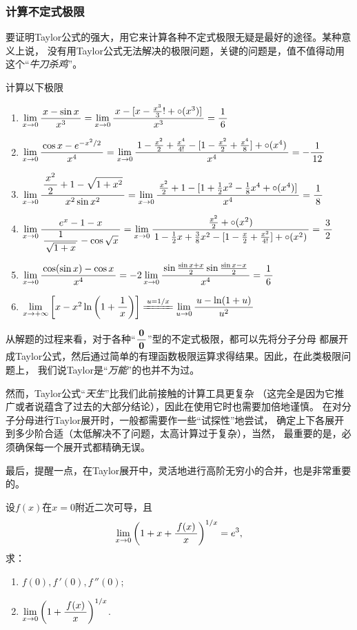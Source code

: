 \subsubsection{计算不定式极限}

要证明Taylor公式的强大，用它来计算各种不定式极限无疑是最好的途径。某种意义上说，
没有用Taylor公式无法解决的极限问题，关键的问题是，值不值得动用这个“{\it 牛刀杀鸡}”。

\egz 计算以下极限
\begin{enumerate}[(1)]
  \setlength{\itemindent}{1cm}
  \item $\lim\limits_{x\to{0}}\displaystyle\frac{\,{x-\sin x}\,}{\,{x^3}\,}
  =\lim\limits_{x\to{0}}\displaystyle\frac{\,{x-[x-\frac{x^3}3!+\circ(x^3)]}\,}{\,{x^3}\,}=\displaystyle\frac{\,{1}\,}{\,{6}\,}$
  \item $\lim\limits_{x\to{0}}\displaystyle\frac{\,{\cos x-e^{-x^2/2}}\,}{\,{x^4}\,}
  =\lim\limits_{x\to{0}}\displaystyle\frac{\,{1-\frac{x^2}2+\frac{x^4}{4!}-[1-\frac{x^2}2+
  \frac{x^4}8]+\circ(x^4)}\,}{\,{x^4}\,}=-\displaystyle\frac{\,{1}\,}{\,{12}\,}$ 
  \item $\lim\limits_{x\to{0}}\displaystyle\frac{\,{\displaystyle\frac{\,{x^2}\,}{\,{2}\,}+1-\sqrt{1+x^2}}\,}{\,{x^2\sin x^2}\,}
  =\lim\limits_{x\to{0}}\displaystyle\frac{\,{\frac{x^2}2+1-[1+\frac12{x^2}-\frac18x^4+\circ(x^4)]}\,}{\,{x^4}\,}
  =\displaystyle\frac{\,{1}\,}{\,{8}\,}$ 
  \item $\lim\limits_{x\to{0}}\displaystyle\frac{\,{e^x-1-x}\,}{\,{\displaystyle\frac{\,{1}\,}{\,{\sqrt{1+x}}\,}-\cos\sqrt x}\,}
  =\lim\limits_{x\to{0}}\displaystyle\frac{\,{\frac{x^2}2+\circ(x^2)}\,}{\,{1-\frac12x+\frac38x^2-[1-\frac{x}2+\frac{x^2}{4!}]+\circ(x^2)}\,}
  =\displaystyle\frac{\,{3}\,}{\,{2}\,}$ 
  \item $\lim\limits_{x\to{0}}\displaystyle\frac{\,{\cos(\sin x)-\cos x}\,}{\,{x^4}\,}
  =-2\lim\limits_{x\to{0}}\displaystyle\frac{\,{\sin\frac{\sin x+x}2\sin\frac{\sin x-x}2}\,}{\,{x^4}\,}=\displaystyle\frac{\,{1}\,}{\,{6}\,}$
  \item $\limx{+\infty}\left[x-x^2\ln\left(1+\df 1x\right)\right]
  \xlongequal{u=1/x}\lim\limits_{u\to0}\df{u-\ln(1+u)}{u^2}$
\end{enumerate}


从解题的过程来看，对于各种“$\displaystyle\frac{\,{\bm0}\,}{\,{\bm0}\,}$”型的不定式极限，都可以先将分子分母
都展开成Taylor公式，然后通过简单的有理函数极限运算求得结果。因此，在此类极限问题上，
我们说Taylor是“{\it 万能}”的也并不为过。

然而，Taylor公式“{\it 天生}”比我们此前接触的计算工具更复杂
（这完全是因为它推广或者说蕴含了过去的大部分结论），因此在使用它时也需要加倍地谨慎。
在对分子分母进行Taylor展开时，一般都需要作一些“试探性”地尝试，
确定上下各展开到多少阶合适（太低解决不了问题，太高计算过于复杂），当然，
最重要的是，必须确保每一个展开式都精确无误。

最后，提醒一点，在Taylor展开中，灵活地进行高阶无穷小的合并，也是非常重要的。

\egz 设$f(x)$在$x=0$附近二次可导，且
$$\lim\limits_{x\to{0}}\left(1+x+\displaystyle\frac{\,{f(x)}\,}{\,{x}\,}\right)^{1/x}=e^3,$$
求：
\begin{enumerate}[(1)]
  \setlength{\itemindent}{1cm}
  \item $f(0),f\,'(0),f\,''(0)$;
  \item $\lim\limits_{x\to{0}}\left(1+\displaystyle\frac{\,{f(x)}\,}{\,{x}\,}\right)^{1/x}$.
\end{enumerate}

